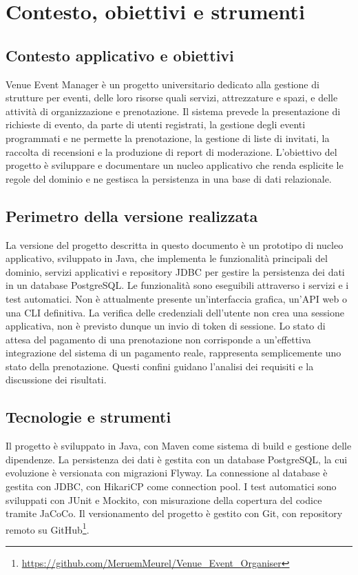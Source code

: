\chapter{Contesto, obiettivi e strumenti}
\label{cap:contesto}

\section{Contesto applicativo e obiettivi}
Venue Event Manager è un progetto universitario dedicato alla gestione di strutture per eventi, delle loro risorse quali servizi, 
attrezzature e spazi, e delle attività di organizzazione e prenotazione.
Il sistema prevede la presentazione di richieste di evento, da parte di utenti registrati, la gestione degli eventi programmati e 
ne permette la prenotazione, la gestione di liste di invitati, la raccolta di recensioni e la produzione di report di moderazione.
L'obiettivo del progetto è sviluppare e documentare un nucleo applicativo che renda esplicite le regole del dominio e ne gestisca la persistenza in una base di dati relazionale.

\section{Perimetro della versione realizzata}
La versione del progetto descritta in questo documento è un prototipo di nucleo applicativo, sviluppato in Java, 
che implementa le funzionalità principali del dominio, servizi applicativi e repository JDBC per gestire la persistenza dei dati 
in un database PostgreSQL.
Le funzionalità sono eseguibili attraverso i servizi e i test automatici. Non è attualmente presente un'interfaccia grafica,
un'API web o una CLI definitiva. La verifica delle credenziali dell'utente non crea una sessione applicativa, non è previsto dunque un
invio di token di sessione. Lo stato di attesa del pagamento di una prenotazione non corrisponde a un'effettiva integrazione del sistema di un pagamento 
reale, rappresenta semplicemente uno stato della prenotazione. 
Questi confini guidano l'analisi dei requisiti e la discussione dei risultati.

\section{Tecnologie e strumenti}
Il progetto è sviluppato in Java, con Maven come sistema di build e gestione delle dipendenze. 
La persistenza dei dati è gestita con un database PostgreSQL, la cui evoluzione è versionata con migrazioni Flyway. 
La connessione al database è gestita con JDBC, con HikariCP come connection pool. 
I test automatici sono sviluppati con JUnit e Mockito, con misurazione della copertura del codice tramite JaCoCo.
Il versionamento del progetto è gestito con Git, con repository remoto su GitHub\footnote{\url{https://github.com/MeruemMeurel/Venue_Event_Organiser}}.


